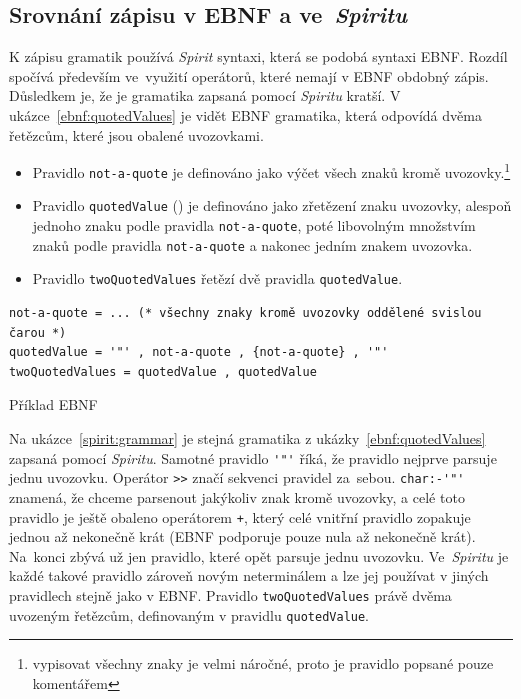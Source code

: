 \documentclass[thesis=B,czech,hidelinks]{FITthesis}[2019/03/06]
\begin{document}
\subsection{Srovnání zápisu v EBNF a ve~\textit{Spiritu}}
K zápisu gramatik používá \textit{Spirit} syntaxi, která se podobá syntaxi EBNF\@. Rozdíl spočívá především ve~využití operátorů, které nemají v EBNF obdobný zápis. Důsledkem je, že je gramatika zapsaná pomocí \textit{Spiritu} kratší. V ukázce~\ref{ebnf:quotedValues} je vidět EBNF gramatika, která odpovídá dvěma řetězcům, které jsou obalené uvozovkami.

\begin{itemize}
    \item Pravidlo \texttt{not-a-quote} je definováno jako výčet všech znaků kromě uvozovky.\footnote{vypisovat všechny znaky je velmi náročné, proto je pravidlo popsané pouze komentářem}
    \item Pravidlo \texttt{quotedValue} () je definováno jako zřetězení znaku uvozovky, alespoň jednoho znaku podle pravidla \texttt{not-a-quote}, poté libovolným množstvím znaků podle pravidla \texttt{not-a-quote} a nakonec jedním znakem uvozovka.
    \item Pravidlo \texttt{twoQuotedValues} řetězí dvě pravidla \texttt{quotedValue}.
\end{itemize}

\begin{listing}[H]
\begin{verbatim}
not-a-quote = ... (* všechny znaky kromě uvozovky oddělené svislou čarou *)
quotedValue = '"' , not-a-quote , {not-a-quote} , '"'
twoQuotedValues = quotedValue , quotedValue
\end{verbatim}
\caption{Příklad EBNF}\label{ebnf:quotedValues}
\end{listing}

Na ukázce~\ref{spirit:grammar} je stejná gramatika z ukázky~\ref{ebnf:quotedValues} zapsaná pomocí \textit{Spiritu}. Samotné pravidlo \verb¨'"'¨ říká, že pravidlo nejprve parsuje jednu uvozovku. Operátor \verb¨>>¨ značí sekvenci pravidel za~sebou. \verb¨char:-'"'¨ znamená, že chceme parsenout jakýkoliv znak kromě uvozovky, a celé toto pravidlo je ještě obaleno operátorem \verb¨+¨, který celé vnitřní pravidlo zopakuje jednou až nekonečně krát (EBNF podporuje pouze nula až nekonečně krát). Na~konci zbývá už jen pravidlo, které opět parsuje jednu uvozovku. Ve~\textit{Spiritu} je každé takové pravidlo zároveň novým neterminálem a lze jej používat v jiných pravidlech stejně jako v EBNF\@. Pravidlo \texttt{twoQuotedValues} právě dvěma uvozeným řetězcům, definovaným v pravidlu \texttt{quotedValue}.
\end{document}
